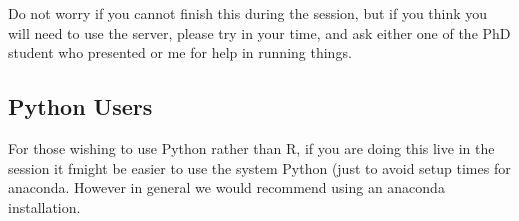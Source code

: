\documentclass{article}
\begin{document}
Do not worry if you cannot finish this during the session, but if you think you
will need to use the server, please try in your time, and ask either one of the
PhD student who presented or me for help in running things. 

\subsection*{Python Users}

For those wishing to use Python rather than R, if you are doing this live in the session it fmight be easier to use the system Python (just to avoid setup times for anaconda. However in general we would recommend using an anaconda installation. 
\end{document}
